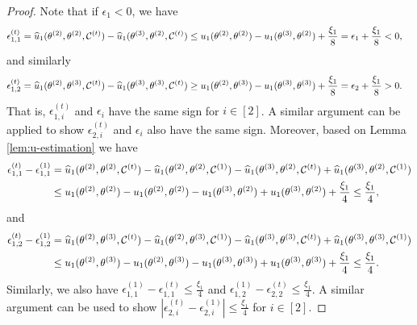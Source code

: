 \begin{proof}
Note that if $\epsilon_1<0$, we have 
\begin{equation}
    \begin{split}
    \label{eqn:sto:case:3111}
    \epsilon^{(t)}_{1,1} = {} &  \widehat{u}_1(\theta^{(2)},\theta^{(2)},\mathcal{C}^{(t)})-\widehat{u}_1(\theta^{(3)},\theta^{(2)},\mathcal{C}^{(t)})\leq {u}_1(\theta^{(2)},\theta^{(2)}) - {u}_1(\theta^{(3)},\theta^{(2)})+\frac{\xi_1}{8} = \epsilon_1  + \frac{\xi_1}{8} <0, 
    \end{split}
\end{equation}
and similarly 
\begin{equation}
    \begin{split}
    \label{eqn:sto:case:3222}
    \epsilon^{(t)}_{1,2} = {} &  \widehat{u}_1(\theta^{(2)},\theta^{(3)},\mathcal{C}^{(t)})-\widehat{u}_1(\theta^{(3)},\theta^{(3)},\mathcal{C}^{(t)})\geq {u}_1(\theta^{(2)},\theta^{(3)}) - {u}_1(\theta^{(3)},\theta^{(3)})+\frac{\xi_1}{8} = \epsilon_2  + \frac{\xi_1}{8} >0. 
    \end{split}
\end{equation}
That is, $\epsilon^{(t)}_{1,i}$ and $\epsilon_i$ have the same sign for $i\in[2]$. A similar argument can be applied to show $\epsilon^{(t)}_{2,i}$ and $\epsilon_i$ also have the same sign.  Moreover, based on Lemma \ref{lem:u-estimation} we have 
\begin{equation*}
\begin{split}
 \epsilon_{1,1}^{(t)} - \epsilon_{1,1}^{(1)} = {} &  \widehat{u}_1(\theta^{(2)},\theta^{(2)},\mathcal{C}^{(t)}) - \widehat{u}_1(\theta^{(2)},\theta^{(2)},\mathcal{C}^{(1)}) - \widehat{u}_1(\theta^{(3)},\theta^{(2)},\mathcal{C}^{(t)}) + \widehat{u}_1(\theta^{(3)},\theta^{(2)},\mathcal{C}^{(1)}) \\   
 \leq  {} &  {u}_1(\theta^{(2)},\theta^{(2)}) - {u}_1(\theta^{(2)},\theta^{(2)}) - {u}_1(\theta^{(3)},\theta^{(2)}) + {u}_1(\theta^{(3)},\theta^{(2)}) + 
 \frac{\xi_1}{4}\leq \frac{\xi_1}{4},
\end{split}
\end{equation*}
and 
\begin{equation*}
\begin{split}
 \epsilon_{1,2}^{(t)} - \epsilon_{1,2}^{(1)} = {} &  \widehat{u}_1(\theta^{(2)},\theta^{(3)},\mathcal{C}^{(t)}) - \widehat{u}_1(\theta^{(2)},\theta^{(3)},\mathcal{C}^{(1)}) - \widehat{u}_1(\theta^{(3)},\theta^{(3)},\mathcal{C}^{(t)}) + \widehat{u}_1(\theta^{(3)},\theta^{(3)},\mathcal{C}^{(1)}) \\
 \leq {} &  {u}_1(\theta^{(2)},\theta^{(3)}) - {u}_1(\theta^{(2)},\theta^{(3)}) - {u}_1(\theta^{(3)},\theta^{(3)}) + {u}_1(\theta^{(3)},\theta^{(3)}) + \frac{\xi_1}{4}
 \leq  \frac{\xi_1}{4}.
\end{split}
\end{equation*}
Similarly, we also have $\epsilon_{1,1}^{(1)}-\epsilon_{1,1}^{(t)}\leq \frac{\xi_1}{4}$ and  $\epsilon_{1,2}^{(1)}-\epsilon_{2,2}^{(t)}\leq \frac{\xi_1}{4}$. A similar argument can be used to show $|\epsilon_{2,i}^{(t)}-\epsilon_{2,i}^{(1)}|\leq\frac{\xi_1}{4}$ for $i\in[2]$.
\end{proof}


